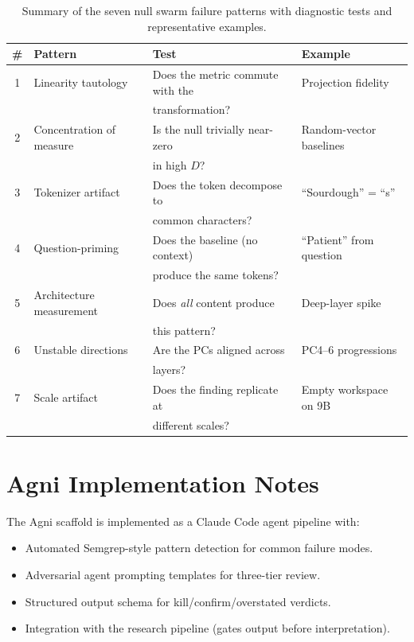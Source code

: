 \documentclass[11pt,a4paper]{article}
\begin{document}
\begin{table}[H]
\centering
\caption{Summary of the seven null swarm failure patterns with
diagnostic tests and representative examples.}
\label{tab:patterns}
\begin{tabular}{clll}
\toprule
\# & Pattern & Test & Example \\
\midrule
1 & Linearity tautology & Does the metric commute with the & Projection fidelity \\
  &                     & transformation? & \\
2 & Concentration of measure & Is the null trivially near-zero & Random-vector baselines \\
  &                          & in high $D$? & \\
3 & Tokenizer artifact & Does the token decompose to & ``Sourdough'' = ``s'' \\
  &                    & common characters? & \\
4 & Question-priming & Does the baseline (no context) & ``Patient'' from question \\
  &                  & produce the same tokens? & \\
5 & Architecture measurement & Does \emph{all} content produce & Deep-layer spike \\
  &                          & this pattern? & \\
6 & Unstable directions & Are the PCs aligned across & PC4--6 progressions \\
  &                     & layers? & \\
7 & Scale artifact & Does the finding replicate at & Empty workspace on 9B \\
  &                & different scales? & \\
\bottomrule
\end{tabular}
\end{table}

\section{Agni Implementation Notes}
\label{app:agni}

The Agni scaffold is implemented as a Claude Code agent pipeline with:
\begin{itemize}[nosep]
    \item Automated Semgrep-style pattern detection for common failure
          modes.
    \item Adversarial agent prompting templates for three-tier review.
    \item Structured output schema for kill/confirm/overstated verdicts.
    \item Integration with the research pipeline (gates output before
          interpretation).
\end{itemize}
\end{document}
